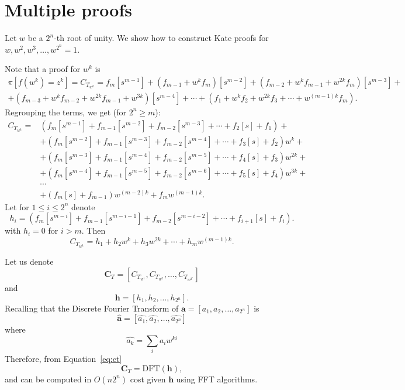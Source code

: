 \documentclass[a4paper]{article}
\begin{document}
\section{Multiple proofs}\label{sec:multiproof}

Let $w$ be a $2^n$-th root of unity. We show how to construct Kate proofs for  $w,w^2,w^3,\ldots, w^{2^n}=1$. 

Note that a proof for $w^k$ is
\begin{multline}
\pi[f(w^k)=z^k] = C_{T_{w^k}}  =f_m[s^{m-1}] + (f_{m-1}+w^kf_{m})[s^{m-2}] + (f_{m-2}+w^kf_{m-1}+w^{2k}f_m)[s^{m-3}] +\\+
(f_{m-3}+w^kf_{m-2}+w^{2k}f_{m-1}+w^{3k})[s^{m-4}]+\cdots +  (f_{1}+w^kf_{2}+w^{2k}f_3+\cdots+w^{(m-1)k}f_m).
\end{multline}
Regrouping the terms, we get (for $2^n\geq m$):
\begin{align}
     C_{T_{w^k}} 
     =&\left(f_m[s^{m-1}]+f_{m-1}[s^{m-2}]+f_{m-2}[s^{m-3}]+\cdots + f_2[s]+f_1\right)+\\
     &+\left(f_m[s^{m-2}]+f_{m-1}[s^{m-3}]+f_{m-2}[s^{m-4}]+\cdots + f_3[s]+f_2\right)w^k+\\
     &+\left(f_m[s^{m-3}]+f_{m-1}[s^{m-4}]+f_{m-2}[s^{m-5}]+\cdots + f_4[s]+f_3\right)w^{2k}+\\
     &+\left(f_m[s^{m-4}]+f_{m-1}[s^{m-5}]+f_{m-2}[s^{m-6}]+\cdots + f_5[s]+f_4\right)w^{3k}+\\
     &\cdots\\
     &+(f_m[s]+f_{m-1})w^{(m-2)k}+f_mw^{(m-1)k}.
\end{align}
Let for $1
\leq i \leq 2^n$ denote $$
h_i = \left(f_m[s^{m-i}]+f_{m-1}[s^{m-i-1}]+f_{m-2}[s^{m-i-2}]+\cdots + f_{i+1}[s]+f_i\right).
$$
with $h_i=0$ for $i>m$. Then
\begin{equation}\label{eq:ct}
     C_{T_{w^k}} = h_1 + h_2w^k + h_3w^{2k}+\cdots + h_mw^{(m-1)k}.
\end{equation}

Let us denote
$$
\mathbf{C}_T = [C_{T_{w^1}},C_{T_{w^2}},\ldots,C_{T_{w^{2^n}}}]
$$
and
$$
\mathbf{h} = [h_1,h_2,\ldots,h_{2^n}].
$$
Recalling that the Discrete Fourier Transform of $\mathbf{a}=[a_1,a_2,\ldots,a_{2^n}]$ is
$$
\widehat{\mathbf{a}}= [\widehat{a_1},\widehat{a_2},\ldots,\widehat{a_{2^n}}]
$$
where 
$$
\widehat{a_k} = \sum_{i}a_iw^{ki}
$$
Therefore, from Equation~\eqref{eq:ct}
\begin{equation}
 \mathbf{C}_T = \mathrm{DFT}(\mathbf{h}), 
\end{equation}
and can be computed in $O(n2^n)$ cost given $\mathbf{h}$ using FFT algorithms.
\end{document}
